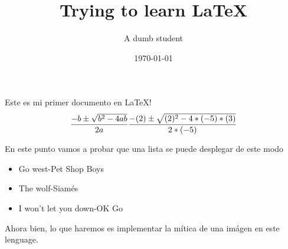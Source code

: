 \documentclass{article}
\title{Trying to learn \LaTeX}
\date{\today}
\author{A dumb student}
\begin{document}
  \maketitle
  Este es mi primer documento en \LaTeX!
  \[
    \frac{-b \pm \sqrt{b^2 -4ab}}{2a} \\
    \frac{-(2) \pm \sqrt{(2)^2 -4*(-5)*(3)}}{2*(-5)}
  \]

  En este punto vamos a probar que una lista se puede desplegar de este modo
  \begin{itemize}
    \item Go west-Pet Shop Boys
    \item The wolf-Siam\'es
    \item I won't let you down-OK Go
  \end{itemize}

  Ahora bien, lo que haremos es implementar la mítica de una imágen en este lenguage.
\end{document}
